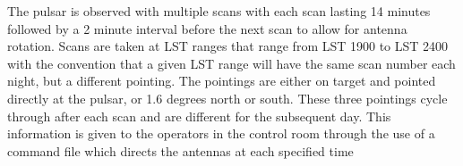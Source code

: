 \documentclass[a4paper,12pt]{article}
\begin{document}
                                                                                                                                                                                                                                                                                                                                                                                                                                                                                                                                                                                                                                                                                                                                                                                                                                                                                                                                                                                                                                                                                                                                                                                                                                                                                                                                                                                                                                                                                                                                                                                                                                                                                                                                                                                                                                                                                                                                                                                                                                                                                                                                                                                                                                                                                                                                                                                                                                                                                                                                                                                                                                                                                                                                                            The pulsar is observed with multiple scans with each scan lasting 14 minutes followed by a 2 minute interval before the next scan to allow for antenna rotation. Scans are taken at LST ranges that range from LST 1900 to LST 2400 with the convention that a given LST range will have the same scan number each night, but a different pointing. The pointings are either on target and pointed directly at the pulsar, or 1.6 degrees north or south. These three pointings cycle through after each scan and are different for the subsequent day. This information is given to the operators in the control room through the use of a command file which directs the antennas at each specified time 
\end{document}
